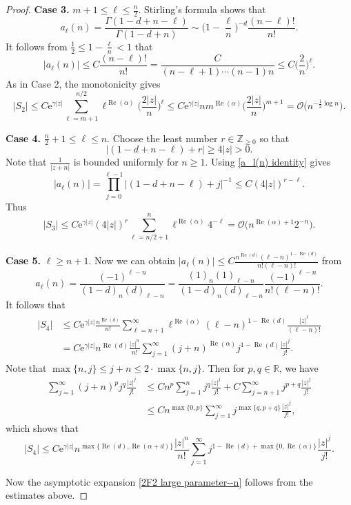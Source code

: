 \documentclass[11pt]{article}
\numberwithin{equation}{section}
\numberwithin{equation}{section}
\newcommand{\RR}{\ensuremath{\mathbb{R}}}
\newcommand{\ZZ}{\ensuremath{\mathbb{Z}}}
\newcommand{\mo}{\mathcal{O}}
\begin{document}
\begin{proof}
	\textbf{Case 3.} $m+1\leqslant \ell\leqslant \frac{n}{2}$. Stirling's formula shows that
	\[a_\ell(n)=\frac{\Gamma(1-d+n-\ell)}{\Gamma(1-d+n)}\sim \biggl(1-\frac{\ell}{n}\biggr)^{-d}\frac{(n-\ell)!}{n!}.\]
	It follows from $\frac{1}{2}\leqslant 1-\frac{\ell}{n}<1$ that
	\[|a_\ell(n)|\leqslant C \frac{(n-\ell)!}{n!}=\frac{C}{(n-\ell+1)\cdots(n-1)n}\leqslant C\bigg(\frac{2}{n}\bigg)^{\ell}.\]
	As in Case 2, the monotonicity gives
	\[|S_2|\leqslant C\mathrm{e}^{\gamma|z|}\sum_{\ell=m+1}^{n/2}\ell^{\operatorname{Re}(\alpha)}\bigg(\frac{2|z|}{n}\bigg)^{\ell}\leqslant C\mathrm{e}^{\gamma|z|}nm^{\operatorname{Re}(\alpha)}\bigg(\frac{2|z|}{n}\bigg)^{m+1}=\mo\big(n^{-\frac{1}{2}\log n}\big).\]
	
	\textbf{Case 4.} $\frac{n}{2}+1\leqslant \ell\leqslant n$. Choose the least number $r\in\ZZ_{\geqslant 0}$ so that
	\[|(1-d+n-\ell)+r|\geqslant 4|z|>0.\]
	Note that $\frac{1}{|z+n|}$ is bounded uniformly for $n\geqslant 1$. Using \eqref{a_l(n) identity} gives
	\[|a_{\ell}(n)|=\prod_{j=0}^{\ell-1}\big|(1-d+n-\ell)+j\big|^{-1}\leqslant C(4|z|)^{r-\ell}.\]
	Thus
	\[|S_3|\leqslant C\mathrm{e}^{\gamma|z|}(4|z|)^r\sum_{\ell=n/2+1}^{n}\ell^{\operatorname{Re}(\alpha)}4^{-\ell}=\mo\big(n^{\operatorname{Re}(\alpha)+1}2^{-n}\big).\]
	
	\textbf{Case 5.} $\ell\geqslant n+1$. Now we can obtain $|a_\ell(n)|\leqslant C\frac{n^{\operatorname{Re}(d)}(\ell-n)^{1-\operatorname{Re}(d)}}{n!(\ell-n)!}$ from
	\[a_\ell(n)=\frac{(-1)^{\ell-n}}{(1-d)_n(d)_{\ell-n}}=\frac{(1)_n(1)_{\ell-n}}{(1-d)_n(d)_{\ell-n}}\frac{(-1)^{\ell-n}}{n!(\ell-n)!}.\]
	It follows that
	\begin{align*}
\begin{aligned}
		|S_4|&{} \leqslant C\mathrm{e}^{\gamma|z|}\frac{n^{\operatorname{Re}(d)}}{n!}\sum_{\ell=n+1}^{\infty}\ell^{\operatorname{Re}(\alpha)}(\ell-n)^{1-\operatorname{Re}(d)}\frac{|z|^{\ell}}{(\ell-n)!}\\
		&{} =C\mathrm{e}^{\gamma|z|}n^{\operatorname{Re}(d)}\frac{|z|^n}{n!}\sum_{j=1}^{\infty}(j+n)^{\operatorname{Re}(\alpha)}j^{1-\operatorname{Re}(d)}\frac{|z|^j}{j!}.
\end{aligned}
	\end{align*}
	Note that $\max\{n,j\}\leqslant j+n\leqslant 2\cdot\max\{n,j\}$. Then for $p,q\in\RR$, we have
	\begin{align*}
		\sum_{j=1}^{\infty}(j+n)^p j^q\frac{|z|^j}{j!}&{}\leqslant Cn^p\sum_{j=1}^{n}j^q\frac{|z|^j}{j!}+C\sum_{j=n+1}^{\infty}j^{p+q}\frac{|z|^j}{j!}\\
		&{} \leqslant Cn^{\max\{0,p\}}\sum_{j=1}^{\infty}j^{\max\{q,p+q\}}\frac{|z|^j}{j!},
	\end{align*}
	which shows that
	\[|S_4|\leqslant C\mathrm{e}^{\gamma|z|}n^{\max\{\operatorname{Re}(d),\operatorname{Re}(\alpha+d)\}}\frac{|z|^n}{n!}\sum_{j=1}^{\infty}j^{1-\operatorname{Re}(d)+\max\{0,\operatorname{Re}(\alpha)\}}\frac{|z|^j}{j!}.\]
	
	Now the asymptotic expansion \eqref{2F2 large parameter--n} follows from the estimates above.
\end{proof}
\end{document}

